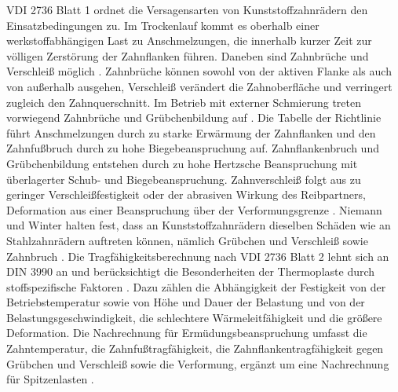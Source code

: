 VDI 2736 Blatt 1 ordnet die Versagensarten von Kunststoffzahnrädern den Einsatzbedingungen zu. Im Trockenlauf kommt es oberhalb einer werkstoffabhängigen Last zu Anschmelzungen, die innerhalb kurzer Zeit zur völligen Zerstörung der Zahnflanken führen. Daneben sind Zahnbrüche und Verschleiß möglich \cite[S.~14]{VDI2736-1}. Zahnbrüche können sowohl von der aktiven Flanke als auch von außerhalb ausgehen, Verschleiß verändert die Zahnoberfläche und verringert zugleich den Zahnquerschnitt. Im Betrieb mit externer Schmierung treten vorwiegend Zahnbrüche und Grübchenbildung auf \cite[S.~15]{VDI2736-1}. Die Tabelle der Richtlinie führt Anschmelzungen durch zu starke Erwärmung der Zahnflanken und den Zahnfußbruch durch zu hohe Biegebeanspruchung auf. Zahnflankenbruch und Grübchenbildung entstehen durch zu hohe Hertzsche Beanspruchung mit überlagerter Schub- und Biegebeanspruchung. Zahnverschleiß folgt aus zu geringer Verschleißfestigkeit oder der abrasiven Wirkung des Reibpartners, Deformation aus einer Beanspruchung über der Verformungsgrenze \cite[S.~16]{VDI2736-1}. Niemann und Winter halten fest, dass an Kunststoffzahnrädern dieselben Schäden wie an Stahlzahnrädern auftreten können, nämlich Grübchen und Verschleiß sowie Zahnbruch \cite[S.~350]{NieWin03}. Die Tragfähigkeitsberechnung nach VDI 2736 Blatt 2 lehnt sich an DIN 3990 an und berücksichtigt die Besonderheiten der Thermoplaste durch stoffspezifische Faktoren \cite[S.~5 f.]{VDI2736-2}. Dazu zählen die Abhängigkeit der Festigkeit von der Betriebstemperatur sowie von Höhe und Dauer der Belastung und von der Belastungsgeschwindigkeit, die schlechtere Wärmeleitfähigkeit und die größere Deformation. Die Nachrechnung für Ermüdungsbeanspruchung umfasst die Zahntemperatur, die Zahnfußtragfähigkeit, die Zahnflankentragfähigkeit gegen Grübchen und Verschleiß sowie die Verformung, ergänzt um eine Nachrechnung für Spitzenlasten \cite[S.~6]{VDI2736-2}.

